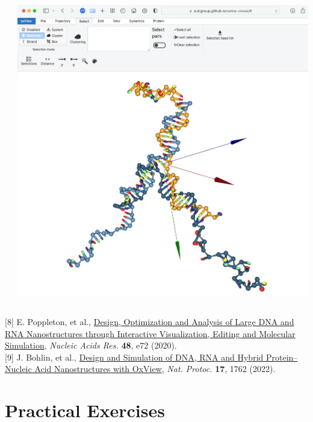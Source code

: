 \documentclass[slidestop,compress,9pt]{beamer}
\begin{document}
\begin{frame}[fragile]
\begin{columns}
\begin{column}{0.6\textwidth}
\end{column}
\begin{column}{0.4\textwidth}
\begin{center}
\vspace*{-0.25cm}
\includegraphics[width=\textwidth]{oxviewer.png}
\end{center}
\end{column}
\end{columns}

\vspace*{0.25cm}

[8] E. Poppleton, et al., \href{https://doi.org/10.1093/nar/gkaa417}{Design, Optimization and Analysis of Large DNA and RNA Nanostructures through Interactive Visualization, Editing and Molecular Simulation}, \textit{Nucleic Acids Res.} \textbf{48}, e72 (2020).\\[3pt]

[9] J. Bohlin, et al., \href{https://doi.org/10.1038/s41596-022-00688-5}{Design and Simulation of DNA, RNA and Hybrid Protein–Nucleic Acid Nanostructures with OxView}, \textit{Nat. Protoc.} \textbf{17}, 1762 (2022).


\end{frame}

\section{Practical Exercises}
\end{document}
